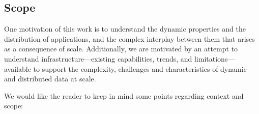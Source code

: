 


\subsection{Scope}




One motivation of this work is to understand the dynamic properties
and the distribution of applications, and the complex interplay
between them that arises as a consequence of scale.  Additionally, we
are motivated by an attempt to understand infrastructure---existing
capabilities, trends, and limitations---available to support the complexity,
challenges and characteristics of dynamic and distributed data at
scale.

We would like the reader to keep in mind some points regarding context and scope:


